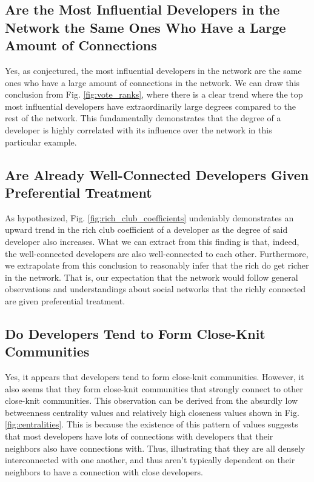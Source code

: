 \documentclass[9pt,twocolumn,twoside]{pnas-new}
\begin{document}
\subsection{Are the Most Influential Developers in the Network the Same Ones Who Have a Large Amount of Connections}

Yes, as conjectured, the most influential developers in the network are the same ones who have a large amount of connections in the network. We can draw this conclusion from Fig. \ref{fig:vote_ranks}, where there is a clear trend where the top most influential developers have extraordinarily large degrees compared to the rest of the network. This fundamentally demonstrates that the degree of a developer is highly correlated with its influence over the network in this particular example.

\subsection{Are Already Well-Connected Developers Given Preferential Treatment}

As hypothesized, Fig. \ref{fig:rich_club_coefficients} undeniably demonstrates an upward trend in the rich club coefficient of a developer as the degree of said developer also increases. What we can extract from this finding is that, indeed, the well-connected developers are also well-connected to each other. Furthermore, we extrapolate from this conclusion to reasonably infer that the rich do get richer in the network. That is, our expectation that the network would follow general observations and understandings about social networks that the richly connected are given preferential treatment.

\subsection{Do Developers Tend to Form Close-Knit Communities}

Yes, it appears that developers tend to form close-knit communities. However, it also seems that they form close-knit communities that strongly connect to other close-knit communities. This observation can be derived from the absurdly low betweenness centrality values and relatively high closeness values shown in Fig. \ref{fig:centralities}. This is because the existence of this pattern of values suggests that most developers have lots of connections with developers that their neighbors also have connections with. Thus, illustrating that they are all densely interconnected with one another, and thus aren't typically dependent on their neighbors to have a connection with close developers.
\end{document}
